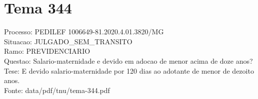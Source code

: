 \documentclass[12pt]{article}
\begin{document}
\section*{Tema 344}
Processo: PEDILEF 1006649-81.2020.4.01.3820/MG\\
Situacao: JULGADO\_SEM\_TRANSITO\\
Ramo: PREVIDENCIARIO\\
Questao: Salario-maternidade e devido em adocao de menor acima de doze anos?\\
Tese: E devido salario-maternidade por 120 dias ao adotante de menor de dezoito anos.\\
Fonte: data/pdf/tnu/tema-344.pdf
\end{document}
